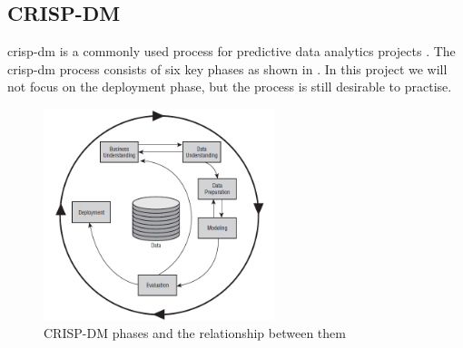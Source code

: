 \documentclass[english, a4paper]{report}
\begin{document}
{{        \subsection{CRISP-DM}\label{crisp-dm}
        {
            \Gls{crisp-dm} is a commonly used process for predictive data analytics projects \cite{mlKelleher}. The \gls{crisp-dm} process consists of six key phases as shown in . In this project we will not focus on the deployment phase, but the process is still desirable to practise. 
            \par 
            \begin{figure}[H]
                \centering \includegraphics[width=0.6\textwidth]{crisp-dm}
                \caption{CRISP-DM phases and the relationship between them \cite{crisp-dm-Image}}
                \label{fig:crisp-dm_fig}
            \end{figure}
            
}}}
\end{document}
